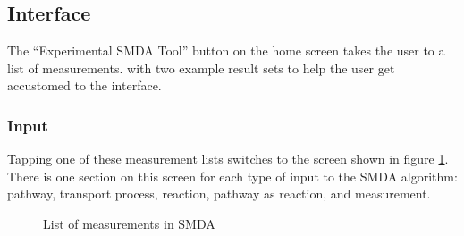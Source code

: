 \subsection{Interface}
\label{sect:smda_interface}

The ``Experimental SMDA Tool'' button on the home screen takes the user to a
list of measurements. \mawapp with two example result sets to help the user get
accustomed to the interface.

\subsubsection{Input}
\label{sect:smda_interface_input}

Tapping one of these measurement lists switches to the screen shown in figure
\ref{fig:screenshot_smda_list}. There is one section on this screen for each
type of input to the SMDA algorithm: pathway, transport process, reaction,
pathway as reaction, and measurement.

\begin{figure}[htb]
    \caption{\label{fig:screenshot_smda_list} List of measurements in SMDA}
\end{figure}


